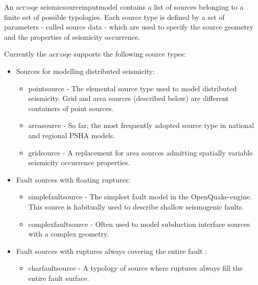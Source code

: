 An \gls{acr:oqe} \gls{seismicsourceinputmodel} contains a list of sources
belonging to a finite set of possible typologies. Each source type is defined
by a set of parameters - called source data - which are used to specify the
source geometry and the properties of seismicity occurrence.

Currently the \gls{acr:oqe} supports the following source types:

\begin{itemize}

    \item Sources for modelling distributed seismicity:

    \begin{itemize}

        \item \Gls{pointsource} - The elemental source type used to model
        distributed seismicity. Grid and area sources (described below) are
        different containers of point sources.

        \item \Gls{areasource} - So far, the most frequently adopted source
        type in national and regional PSHA models.

        \item \Gls{gridsource} - A replacement for area sources admitting
        spatially variable seismicity occurrence properties.

    \end{itemize}

    \item Fault sources with floating ruptures:

    \begin{itemize}

        \item \Gls{simplefaultsource} - The simplest fault model in the
        OpenQuake-engine. This source is habitually used to describe shallow
        seismogenic faults.

        \item \Gls{complexfaultsource} - Often used to model subduction
        interface sources with a complex geometry.

    \end{itemize}

    \item Fault sources with ruptures always covering the entire fault
    \surface:

    \begin{itemize}

        \item \Gls{charfaultsource} - A typology of source where ruptures
        always fill the entire fault surface.

    \end{itemize}

\end{itemize}

